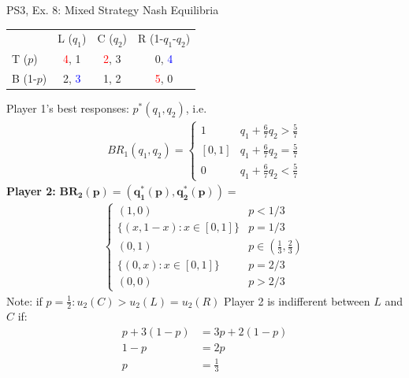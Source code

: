 \begin{frame}{PS3, Ex. 8: Mixed Strategy Nash Equilibria}
  \begin{multicols}{2}
    \begin{table}
      \begin{tabular}{l|c|c|c|}
          \multicolumn{1}{c}{}  & \multicolumn{1}{c}{L ($q_1$)} & \multicolumn{1}{c}{C ($q_2$)} & \multicolumn{1}{c}{R (1-$q_1$-$q_2$)} \\\cline{2-4}
          T ($p$)   & \textcolor{red}{4}, 1 & \textcolor{red}{2}, 3 & 0, \textcolor{blue}{4} \\\cline{2-4}
          B (1-$p$) & 2, \textcolor{blue}{3} & 1, 2 & \textcolor{red}{5}, 0 \\\cline{2-4}
      \end{tabular}
    \end{table}
    Player 1's best responses: $p^{*}(q_1,q_2)$, i.e.
    \begin{align*}
      BR_1(q_1,q_2)=
      \left\{ \begin{array}{ll}
          1                 & q_1 + \frac{6}{7}q_2 > \frac{5}{7}\\
          \left[0,1\right]  & q_1 + \frac{6}{7}q_2 = \frac{5}{7}\\
          0                 & q_1 + \frac{6}{7}q_2 < \frac{5}{7}
      \end{array}\right.
    \end{align*}
    \textbf{Player 2:} $\bm{BR_2(p)=\left(q_1^{*}(p),q_2^{*}(p)\right)}=$
    \begin{align*}
      \left\{ \begin{array}{ll}
          (1,0)                 & p < 1/3 \\
          \{(x,1-x):x\in[0,1]\} & p = 1/3 \\
          (0,1)                 & p\in\left(\frac{1}{3},\frac{2}{3}\right)\\
          \{(0,x):x\in[0,1]\}   & p = 2/3 \\
          (0,0)                 & p > 2/3
      \end{array}\right.
    \end{align*}
    Note: if $p=\frac{1}{2}:u_2(C)>u_2(L)=u_2(R)$
  \vfill\null \columnbreak
    Player 2 is indifferent between $L$ and $C$ if:
    \begin{align*}
      p+3(1-p)&= 3p + 2(1-p) \\
      1-p     &= 2p \\
      p       &= \frac{1}{3}
    \end{align*}

\end{multicols}
\end{frame}
